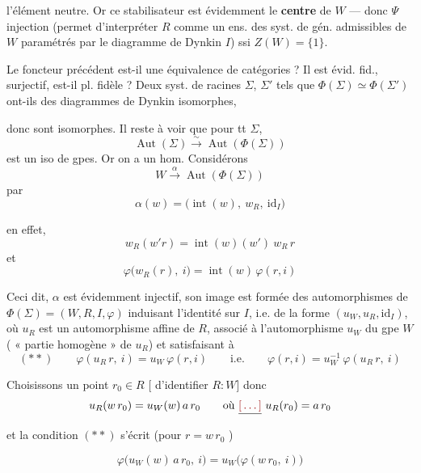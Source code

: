 \documentclass[11pt,a4paper]{article}
\begin{document}
\struck{\ill{}} l'élément neutre. Or ce stabilisateur est évidemment le
\textbf{centre} de $W$ — donc $\Psi$ injection (permet d'interpréter $R$ comme
un ens. des syst. de gén. admissibles de $W$ paramétrés par le diagramme de
Dynkin $I$) ssi $Z(W) = \{1\}$.

Le foncteur précédent est-il une équivalence de catégories ? Il est évid.
fid.,  surjectif, est-il pl. fidèle ? Deux syst. de racines
$\Sigma$, $\Sigma'$ tels que $\Phi(\Sigma) \simeq \Phi(\Sigma')$ ont-ils des
diagrammes de Dynkin isomorphes,


donc sont isomorphes. Il reste à voir que pour tt $\Sigma$,
\[
  \operatorname{Aut}(\Sigma) \overset{\sim}{\longrightarrow}
  \operatorname{Aut}(\Phi(\Sigma))
\]
est un iso de gpes. Or on a un hom. Considérons
\[
  W \overset{\alpha}{\longrightarrow} \operatorname{Aut}(\Phi(\Sigma))
\]
par
\[
  \alpha(w) = \bigl(\operatorname{int}(w),\ w_R,\ \mathrm{id}_I\bigr)
\]

en effet,
\[
  w_R(w'r) = \operatorname{int}(w)(w')\ w_R\,r
\]
et
\[
  \varphi\bigl(w_R(r),\ i\bigr) = \operatorname{int}(w)\,\varphi(r,i)
\]

Ceci dit, $\alpha$ est  évidemment injectif, son image est
formée des automorphismes de $\Phi(\Sigma) = (W,R,I,\varphi)$ induisant
l'identité sur $I$, i.e. de la forme $(u_W, u_R, \mathrm{id}_I)$, où $u_R$ est
un automorphisme affine de $R$, associé à l'automorphisme $u_W$ du gpe $W$
( « partie homogène » de $u_R$) et satisfaisant à
\[
  (\ast\ast) \qquad \varphi(u_R\,r,\ i) = u_W\,\varphi(r,i)
  \qquad \text{i.e.} \qquad
  \varphi(r,i) = u_W^{-1}\,\varphi(u_R\,r,\ i)
\]

Choisissons un point $r_0 \in R$ [\struck{\ill{}} d'identifier $R : W$] donc
\ill{}
\[
  u_R(w\,r_0) = u_W(w)\,a\,r_0
  \qquad \text{où } \struck{\ill{}}\ u_R(r_0) = a\,r_0
\]
et la condition $(\ast\ast)$ s'écrit (pour $r = w\,r_0$ \ill{})


\[
  \varphi\bigl(u_W(w)\,a\,r_0,\ i\bigr) = u_W\bigl(\varphi(w\,r_0,\ i)\bigr)
\]
\end{document}
